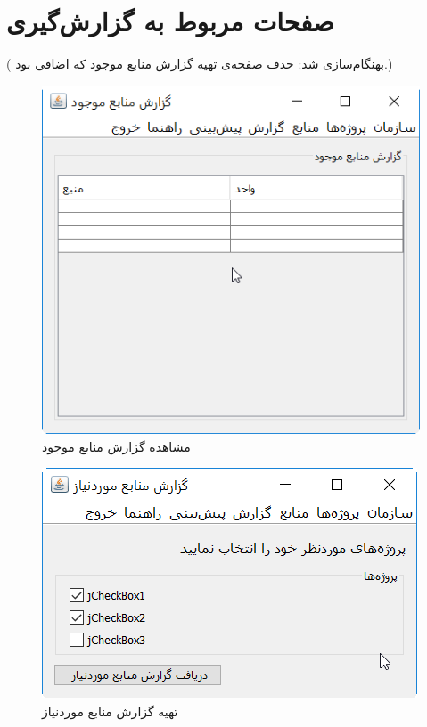 \section{صفحات مربوط به گزارش‌گیری}
({\color{red} بهنگام‌سازی شد: حدف صفحه‌ی تهیه گزارش منابع موجود که اضافی بود.})
\begin{figure}[H]
	\centering
	\includegraphics[scale=0.8]{img/prot/ViewAvailableResourcesReport}
	\caption{مشاهده گزارش منابع موجود}
\end{figure}
\begin{figure}[H]
	\centering
	\includegraphics[scale=0.8]{img/prot/NeededResourceReport}
	\caption{تهیه گزارش منابع موردنیاز}
\end{figure}
